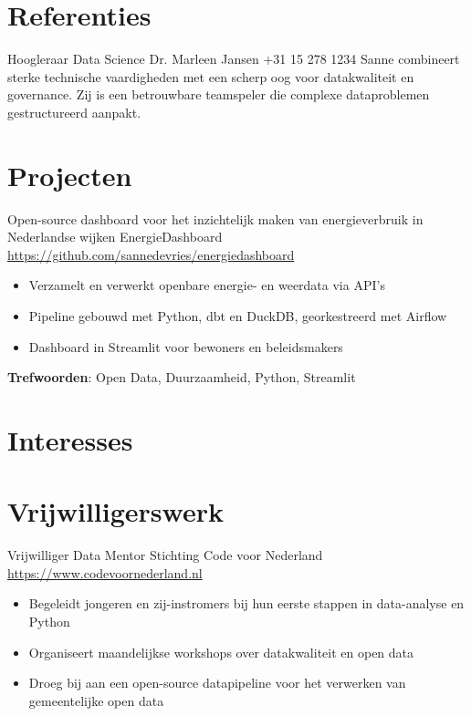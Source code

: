 \documentclass[a4paper, serif, 10pt]{moderncv}
\begin{document}
\section{Referenties}

        {Hoogleraar Data Science}
        {Dr. Marleen Jansen}
        {+31 15 278 1234}
        {}
        {Sanne combineert sterke technische vaardigheden met een scherp oog voor datakwaliteit en governance. Zij is een betrouwbare teamspeler die complexe dataproblemen gestructureerd aanpakt.}
\section{Projecten}

        {Open-source dashboard voor het inzichtelijk maken van energieverbruik in Nederlandse wijken}
        {EnergieDashboard}
        {\url{https://github.com/sannedevries/energiedashboard}}
        {}
        {\begin{itemize}
\item Verzamelt en verwerkt openbare energie- en weerdata via API's
\item Pipeline gebouwd met Python, dbt en DuckDB, georkestreerd met Airflow
\item Dashboard in Streamlit voor bewoners en beleidsmakers
\end{itemize}
\textbf{Trefwoorden}: Open Data, Duurzaamheid, Python, Streamlit}
\section{Interesses}

\section{Vrijwilligerswerk}

        {Vrijwilliger Data Mentor}
        {Stichting Code voor Nederland}
        {\url{https://www.codevoornederland.nl}}
        {}
        {\begin{itemize}
\item Begeleidt jongeren en zij-instromers bij hun eerste stappen in data-analyse en Python
\item Organiseert maandelijkse workshops over datakwaliteit en open data
\item Droeg bij aan een open-source datapipeline voor het verwerken van gemeentelijke open data
\end{itemize}}
    
\end{document}

